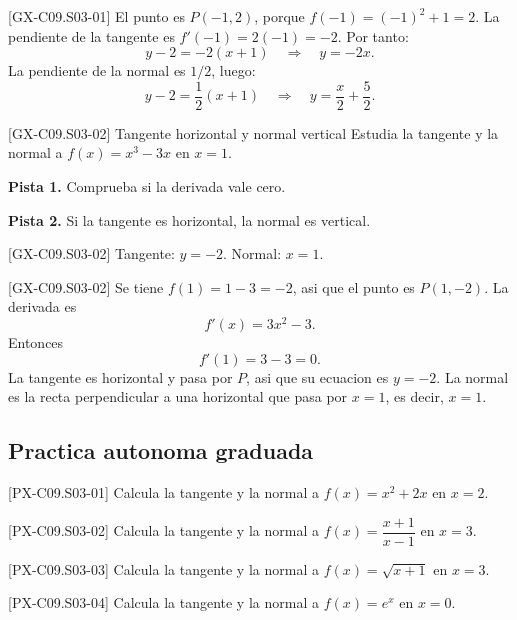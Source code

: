 \begin{fullsolution}{[GX-C09.S03-01]}
El punto es \(P(-1,2)\), porque \(f(-1)=(-1)^2+1=2\). La pendiente de la tangente es
\(f'(-1)=2(-1)=-2\). Por tanto:
\[
y-2=-2(x+1)\quad\Longrightarrow\quad y=-2x.
\]
La pendiente de la normal es \(1/2\), luego:
\[
y-2=\frac{1}{2}(x+1)\quad\Longrightarrow\quad y=\frac{x}{2}+\frac{5}{2}.
\]
\end{fullsolution}

\begin{guidedexercise}{[GX-C09.S03-02] Tangente horizontal y normal vertical}
Estudia la tangente y la normal a \(f(x)=x^3-3x\) en \(x=1\).

\textbf{Pista 1.} Comprueba si la derivada vale cero.

\textbf{Pista 2.} Si la tangente es horizontal, la normal es vertical.
\end{guidedexercise}

\begin{shortanswer}{[GX-C09.S03-02]}
Tangente: \(y=-2\). Normal: \(x=1\).
\end{shortanswer}

\begin{fullsolution}{[GX-C09.S03-02]}
Se tiene \(f(1)=1-3=-2\), asi que el punto es \(P(1,-2)\). La derivada es
\[
f'(x)=3x^2-3.
\]
Entonces
\[
f'(1)=3-3=0.
\]
La tangente es horizontal y pasa por \(P\), asi que su ecuacion es \(y=-2\). La normal es la
recta perpendicular a una horizontal que pasa por \(x=1\), es decir, \(x=1\).
\end{fullsolution}

\subsection*{Practica autonoma graduada}

\begin{exercise}{[PX-C09.S03-01] Calcula la tangente y la normal a \(f(x)=x^2+2x\) en \(x=2\).}
\end{exercise}

\begin{exercise}{[PX-C09.S03-02] Calcula la tangente y la normal a \(f(x)=\dfrac{x+1}{x-1}\) en \(x=3\).}
\end{exercise}

\begin{exercise}{[PX-C09.S03-03] Calcula la tangente y la normal a \(f(x)=\sqrt{x+1}\) en \(x=3\).}
\end{exercise}

\begin{exercise}{[PX-C09.S03-04] Calcula la tangente y la normal a \(f(x)=e^x\) en \(x=0\).}
\end{exercise}

